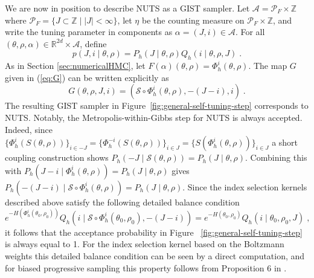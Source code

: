 \documentclass[letterpaper,11pt]{article}
\theoremstyle{plain}%
\theoremstyle{remark}
\begin{document}
We are now in position to describe NUTS as a GIST sampler. Let $\mathcal{A} = \mathcal{P}_F \times \mathbb{Z}$ where 
$\mathcal{P}_F = \{J \subset \mathbb{Z} \mid |J|<\infty \}$, let $\eta$ be the counting measure on $\mathcal{P}_F \times \mathbb{Z}$, and write the tuning parameter in components as $\alpha = (J, i) \in \mathcal{A}$. For all $(\theta, \rho, \alpha) \in \mathbb{R}^{2d} \times \mathcal{A}$, define
\[p(J, i \mid \theta, \rho) = P_h(J \mid \theta, \rho) Q_h(i \mid \theta, \rho, J) \;. \]
As in Section \ref{sec:numericalHMC}, let $F(\alpha)(\theta, \rho) = \Phi_h^i(\theta, \rho)$.
The map $G$ given in (\ref{eq:G}) can be written explicitly as
\[G(\theta, \rho, J, i) = (\mathcal{S} \circ \Phi_h^i(\theta, \rho), -(J- i), i) \;.
\]
The resulting GIST sampler in Figure~\ref{fig:general-self-tuning-step} corresponds to NUTS. Notably, the Metropolis-within-Gibbs step for NUTS is always accepted. Indeed, since $\{\Phi_h^i(S(\theta, \rho))\}_{i \in -J} = \{\Phi_h^{-i}(S(\theta, \rho))\}_{i \in J} =\{S(\Phi_h^{i}(\theta, \rho))\}_{i \in J}$ a short coupling construction shows $P_h(-J \mid \mathcal{S}(\theta, \rho)) = P_h(J \mid \theta, \rho)$. Combining this with $P_h(J-i \mid \Phi_h^i(\theta, \rho)) = P_h(J \mid \theta, \rho)$ gives $P_h(-(J-i) \mid \mathcal{S} \circ \Phi_h^i(\theta, \rho)) = P_h(J \mid \theta, \rho)$. Since the index selection kernels described above satisfy the following detailed balance condition
\[e^{-H(\Phi_h^i(\theta_0, \rho_0))} Q_h(i \mid \mathcal{S} \circ \Phi_h^i(\theta_0, \rho_0), -(J - i)) = e^{-H(\theta_0, \rho_0)} Q_h(i \mid \theta_0, \rho_0, J) \;, \]
it follows that the acceptance probability in Figure ~\ref{fig:general-self-tuning-step} is always equal to 1. For the index selection kernel based on the Boltzmann weights this detailed balance condition can be seen by a direct computation, and for biased progressive sampling this property follows from Proposition 6 in \cite{durmus2023convergence}.
\end{document}
